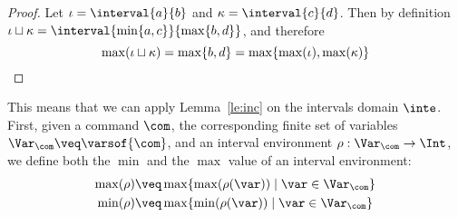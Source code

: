 \begin{proof}
  Let \(\iota = \interval{a}{b}\) and \(\kappa =
  \interval{c}{d}\). Then by definition
  \(\iota \sqcup \kappa = \interval{\min\{a,c\}}{\max\{b,d\}}\), and
  therefore
  \begin{equation*}
    \max(\iota \sqcup \kappa) = \max\{b,d\} = \max\{\max(\iota), \max(\kappa)\} \qedhere
  \end{equation*}
\end{proof}



 


This means that we can apply Lemma~\ref{le:inc} on the intervals
domain \(\inte\).  First, given a command \(\com\), the corresponding
finite set of variables \(\Var_{\com} \veq \varsof{\com}\), and an
interval environment \(\rho : \Var_{\com} \to \Int\), we define both
the \(\min\) and the \(\max\) value of an interval environment:
\begin{align*}
\max(\rho) & \veq \max \{ \max(\rho(\var)) \mid \var \in \Var_{\com}\} \\
\min(\rho) & \veq \max \{ \min(\rho(\var)) \mid \var \in \Var_{\com}\}
\end{align*}

